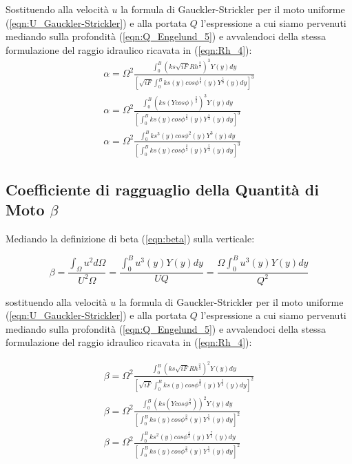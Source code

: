 \documentclass[12pt]{article} %
\begin{document}
\noindent Sostituendo alla velocità $u$ la formula di Gauckler-Strickler per il moto uniforme (\ref{eqn:U_Gauckler-Strickler}) e alla portata $Q$ l’espressione a cui siamo pervenuti mediando sulla profondità (\ref{eqn:Q_Engelund_5}) e avvalendoci della stessa formulazione del raggio idraulico ricavata in (\ref{eqn:Rh_4}):
\begin{equation}
    \begin{gathered}
        \alpha=\Omega^{2}\frac{\int_{0}^{B}\left(ks\sqrt{iF}Rh^{\frac{2}{3}}\right)^{3}Y(y)dy}{[\sqrt{iF}\int_{0}^{B} ks(y)cos\phi^{\frac{2}{3}}(y)Y^{\frac{5}{3}}(y)dy]^{3}}
        \\
        \alpha=\Omega^{2}\frac{\int_{0}^{B}\left(ks(Ycos\phi)^{\frac{2}{3}}\right)^{3}Y(y)dy}{[\int_{0}^{B} ks(y)cos\phi^{\frac{2}{3}}(y)Y^{\frac{5}{3}}(y)dy]^{3}}
        \\
        \alpha=\Omega^{2}\frac{\int_{0}^{B}ks^3(y)cos\phi^{2}(y)Y^{3}(y)dy}{[\int_{0}^{B} ks(y)cos\phi^{\frac{2}{3}}(y)Y^{\frac{5}{3}}(y)dy]^{3}}
    \end{gathered}
    \label{eqn:alfa_Engelund_2}
\end{equation}

\subsection{\texorpdfstring{Coefficiente di ragguaglio della Quantità di Moto $\beta$}{}}

\noindent Mediando la definizione di beta (\ref{eqn:beta}) sulla verticale:

\begin{equation}
   \beta=\frac{\int_{\Omega}^{} u^{2}d\Omega}{ U^{2}\Omega}=\frac{\int_{0}^{B} u^{3}(y)Y(y)dy}{UQ}=\frac{\Omega \int_{0}^{B} u^{3}(y)Y(y)dy}{Q^{2}}
   \label{eqn:beta_Engelund_1}
\end{equation}

\noindent sostituendo alla velocità $u$ la formula di Gauckler-Strickler per il moto uniforme (\ref{eqn:U_Gauckler-Strickler}) e alla portata $Q$ l’espressione a cui siamo pervenuti mediando sulla profondità (\ref{eqn:Q_Engelund_5}) e avvalendoci della stessa formulazione del raggio idraulico ricavata in (\ref{eqn:Rh_4}):

\begin{equation}
    \begin{gathered}
        \beta=\Omega^{2}\frac{\int_{0}^{B}(ks\sqrt{iF}Rh^{\frac{2}{3}})^{2}Y(y)dy}{[\sqrt{iF}\int_{0}^{B} ks(y)cos\phi^{\frac{2}{3}}(y)Y^{\frac{5}{3}}(y)dy]^{2}}
        \\
        \beta=\Omega^{2}\frac{\int_{0}^{B}(ks(Ycos\phi^{\frac{2}{3}}))^{2}Y(y)dy}{[\int_{0}^{B} ks(y)cos\phi^{\frac{2}{3}}(y)Y^{\frac{5}{3}}(y)dy]^{2}}
        \\
        \beta=\Omega^{2}\frac{\int_{0}^{B}ks^{2}(y)cos\phi^{\frac{4}{3}}(y)Y^{\frac{7}{3}}(y)dy}{[\int_{0}^{B} ks(y)cos\phi^{\frac{2}{3}}(y)Y^{\frac{5}{3}}(y)dy]^{2}}
        \end{gathered}
        \label{eqn:beta_Engelund_2}
\end{equation}
\end{document}

